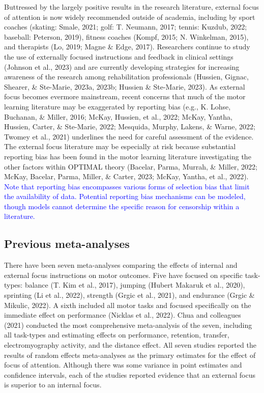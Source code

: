 \documentclass[
  man, donotrepeattitle,floatsintext]{apa7}
\begin{document}
Buttressed by the largely positive results in the research literature, external focus of attention is now widely recommended outside of academia, including by sport coaches (skating: Smale, 2021; golf: T. Neumann, 2017; tennis: Kuzdub, 2022; baseball: Peterson, 2019), fitness coaches (Kompf, 2015; N. Winkelman, 2015), and therapists (Lo, 2019; Magne \& Edge, 2017). Researchers continue to study the use of externally focused instructions and feedback in clinical settings (Johnson et al., 2023) and are currently developing strategies for increasing awareness of the research among rehabilitation professionals (Hussien, Gignac, Shearer, \& Ste-Marie, 2023a, 2023b; Hussien \& Ste-Marie, 2023). As external focus becomes evermore mainstream, recent concerns that much of the motor learning literature may be exaggerated by reporting bias (e.g., K. Lohse, Buchanan, \& Miller, 2016; McKay, Hussien, et al., 2022; McKay, Yantha, Hussien, Carter, \& Ste-Marie, 2022; Mesquida, Murphy, Lakens, \& Warne, 2022; Twomey et al., 2021) underlines the need for careful assessment of the evidence. The external focus literature may be especially at risk because substantial reporting bias has been found in the motor learning literature investigating the other factors within OPTIMAL theory (Bacelar, Parma, Murrah, \& Miller, 2022; McKay, Bacelar, Parma, Miller, \& Carter, 2023; McKay, Yantha, et al., 2022). \textcolor{blue}{Note that reporting bias encompasses various forms of selection bias that limit the availability of data. Potential reporting bias mechanisms can be modeled, though models cannot determine the specific reason for censorship within a literature.}

\hypertarget{previous-meta-analyses}{%
\subsection{Previous meta-analyses}\label{previous-meta-analyses}}

There have been seven meta-analyses comparing the effects of internal and external focus instructions on motor outcomes. Five have focused on specific task-types: balance (T. Kim et al., 2017), jumping (Hubert Makaruk et al., 2020), sprinting (Li et al., 2022), strength (Grgic et al., 2021), and endurance (Grgic \& Mikulic, 2022). A sixth included all motor tasks and focused specifically on the immediate effect on performance (Nicklas et al., 2022). Chua and colleagues (2021) conducted the most comprehensive meta-analysis of the seven, including all task-types and estimating effects on performance, retention, transfer, electromyography activity, and the distance effect. All seven studies reported the results of random effects meta-analyses as the primary estimates for the effect of focus of attention. Although there was some variance in point estimates and confidence intervals, each of the studies reported evidence that an external focus is superior to an internal focus.
\end{document}
